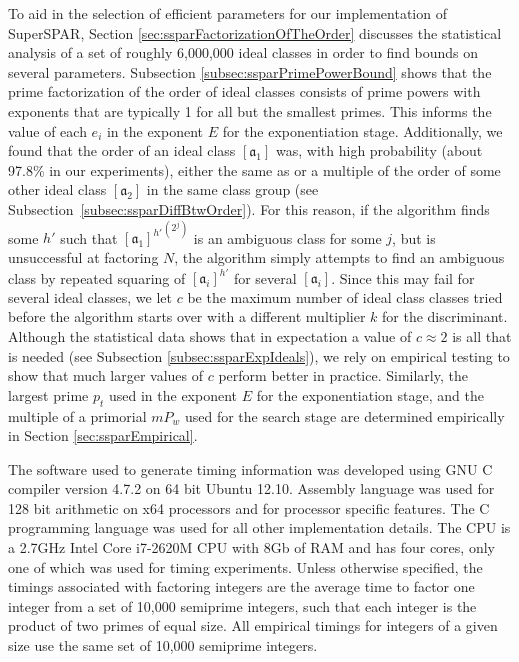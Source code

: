 \documentclass{ucalgthes1}
\theoremstyle{definition}
\newcommand{\ideal}{\mathfrak}
\newcommand{\compiler}{GNU C compiler version 4.7.2}
\newcommand{\cpu}{2.7GHz Intel Core i7-2620M CPU}
\begin{document}
To aid in the selection of efficient parameters for our implementation of SuperSPAR, Section \ref{sec:ssparFactorizationOfTheOrder} discusses the statistical analysis of a set of roughly 6,000,000 ideal classes in order to find bounds on several parameters.  Subsection \ref{subsec:ssparPrimePowerBound} shows that the prime factorization of the order of ideal classes consists of prime powers with exponents that are typically 1 for all but the smallest primes.  This informs the value of each $e_i$ in the exponent $E$ for the exponentiation stage.  Additionally, we found that the order of an ideal class $[\ideal a_1]$ was, with high probability (about 97.8\% in our experiments), either the same as or a multiple of the order of some other ideal class $[\mathfrak a_2]$ in the same class group (see Subsection~\ref{subsec:ssparDiffBtwOrder}).  For this reason, if the algorithm finds some $h'$ such that ${[\mathfrak a_1]^{h'}}^{\left(2^j\right)}$ is an ambiguous class for some $j$, but is unsuccessful at factoring $N$, the algorithm simply attempts to find an ambiguous class by repeated squaring of $[\mathfrak a_i]^{h'}$ for several $[\mathfrak a_i]$.  Since this may fail for several ideal classes, we let $c$ be the maximum number of ideal class classes tried before the algorithm starts over with a different multiplier $k$ for the discriminant.  Although the statistical data shows that in expectation a value of $c \approx 2$ is all that is needed (see Subsection \ref{subsec:ssparExpIdeals}), we rely on empirical testing to show that much larger values of $c$ perform better in practice.  Similarly, the largest prime $p_t$ used in the exponent $E$ for the exponentiation stage, and the multiple of a primorial $mP_w$ used for the search stage are determined empirically in Section \ref{sec:ssparEmpirical}.

The software used to generate timing information was developed using \compiler{} on 64 bit Ubuntu 12.10.  Assembly language was used for 128 bit arithmetic on x64 processors and for processor specific features.  The C programming language was used for all other implementation details.  The CPU is a \cpu{} with 8Gb of RAM and has four cores, only one of which was used for timing experiments.  Unless otherwise specified, the timings associated with factoring integers are the average time to factor one integer from a set of 10,000 semiprime integers, such that each integer is the product of two primes of equal size.  All empirical timings for integers of a given size use the same set of 10,000 semiprime integers.
\end{document}
